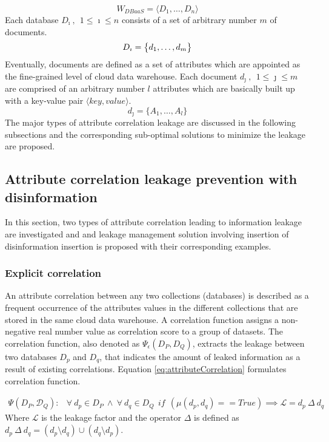 \[
W_{DBaaS}=\Big \langle D_1,\dots,D_n \Big \rangle
\]
Each database $D_\imath ~, ~~ 1\leqslant \imath \leqslant n$ consists of a set of arbitrary number  $m$ of documents.
\[
D_\imath=\big\{ d_1,\dots,d_m\big\}\\
\] 
Eventually, documents are defined as a set of attributes which are appointed as the fine-grained level of cloud data warehouse. Each document $d_\jmath~,~~1\leqslant \jmath \leqslant m$ are comprised of an arbitrary number $l$ attributes which are basically built up with a key-value pair $\langle key, value\rangle$. 
\[
d_\jmath=\big\{ A_1,\dots, A_l\big\} 
\]
The major types of attribute correlation leakage are discussed in the following subsections and the corresponding sub-optimal solutions to minimize the leakage are proposed.

\subsection{Attribute correlation leakage prevention with disinformation}
\label{AttributeCorrelationSubsection}
In this section, two types of attribute correlation leading to information leakage are investigated and and leakage management solution involving insertion of disinformation insertion is proposed with their corresponding examples. 

\subsubsection{Explicit correlation}
\label{ExplicitCorrelationSubsection}

An attribute correlation between any two collections (databases) is described as a frequent occurrence of the attributes values in the different collections that are stored in the same cloud data warehouse. A correlation function assigns a non-negative real number value as correlation score to a group of datasets. The correlation function, also denoted as $\Psi_{\epsilon}(D_P,D_Q)$, extracts the leakage between two databases $D_p$ and $D_q$, that indicates the amount of leaked information as a result of existing correlations. Equation \ref{eq:attributeCorrelation} formulates correlation function.

\begin{equation}
\label{eq:attributeCorrelation}
\begin{aligned}
\Psi (D_P,\mathcal{D}_Q):
& \forall~d_p \in D_P ~\land~ \forall~ d_q \in D_Q ~~if~~ (\mu(d_p,d_q)==True) \implies \mathcal{L}=d_p~ \Delta ~d_q 
\end{aligned}
\end{equation}
Where $\mathcal{L}$ is the leakage factor and the operator $\Delta$ is defined as $d_p~ \Delta ~d_q =(d_p\setminus d_q)\cup (d_q\setminus d_p)$.\\

